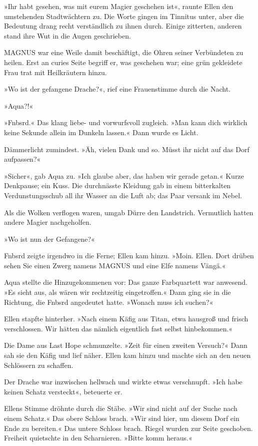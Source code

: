»Ihr habt gesehen, was mit eurem Magier geschehen ist«, raunte Ellen den umstehenden Stadtwächtern zu. Die Worte gingen im Tinnitus unter, aber die Bedeutung drang recht verständlich zu ihnen durch. Einige zitterten, anderen stand ihre Wut in die Augen geschrieben.

MAGNUS war eine Weile damit beschäftigt, die Ohren seiner Verbündeten zu heilen. Erst an curies Seite begriff er, was geschehen war; eine grün gekleidete Frau trat mit Heilkräutern hinzu.

»Wo ist der gefangene Drache?«, rief eine Frauenstimme durch die Nacht.

»Aqua?!«

»Fnbsrd.« Das klang liebe- und vorwurfsvoll zugleich. »Man kann dich wirklich keine Sekunde allein im Dunkeln lassen.« Dann wurde es Licht.

Dämmerlicht zumindest. »Äh, vielen Dank und so. Müsst ihr nicht auf das Dorf aufpassen?«

»Sicher«, gab Aqua zu. »Ich glaube aber, das haben wir gerade getan.« Kurze Denkpause; ein Kuss. Die durchnässte Kleidung gab in einem bitterkalten Verdunstungsschub all ihr Wasser an die Luft ab; das Paar versank im Nebel.

Als die Wolken verflogen waren, umgab Dürre den Landstrich. Vermutlich hatten andere Magier nachgeholfen.

»Wo ist nun der Gefangene?«

Fnbsrd zeigte irgendwo in die Ferne; Ellen kam hinzu. »Moin. Ellen. Dort drüben sehen Sie einen Zwerg namens MAGNUS und eine Elfe namens Vängä.«

Aqua stellte die Hinzugekommenen vor: Das ganze Farbquartett war anwesend. »Es sieht aus, als wären wir rechtzeitig eingetroffen.« Dann ging sie in die Richtung, die Fnbsrd angedeutet hatte. »Wonach muss ich suchen?«

Ellen stapfte hinterher. »Nach einem Käfig aus Titan, etwa hausgroß und frisch verschlossen. Wir hätten das nämlich eigentlich fast selbst hinbekommen.«

Die Dame aus Last Hope schmunzelte. »Zeit für einen zweiten Versuch?« Dann sah sie den Käfig und lief näher. Ellen kam hinzu und machte sich an den neuen Schlössern zu schaffen.

Der Drache war inzwischen hellwach und wirkte etwas verschnupft. »Ich habe keinen Schatz versteckt«, beteuerte er.

Ellens Stimme dröhnte durch die Stäbe. »Wir sind nicht auf der Suche nach einem Schatz.« Das obere Schloss brach. »Wir sind hier, um diesem Dorf ein Ende zu bereiten.« Das untere Schloss brach. Riegel wurden zur Seite geschoben. Freiheit quietschte in den Scharnieren. »Bitte komm heraus.«

